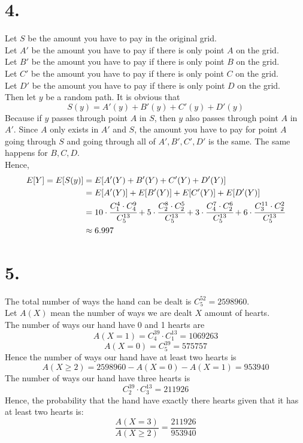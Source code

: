 \documentclass[11pt]{article}
\begin{document}
\section*{4.}
Let $S$ be the amount you have to pay in the original grid. \\
Let $A'$ be the amount you have to pay if there is only point $A$ on the grid. \\
Let $B'$ be the amount you have to pay if there is only point $B$ on the grid. \\
Let $C'$ be the amount you have to pay if there is only point $C$ on the grid. \\
Let $D'$ be the amount you have to pay if there is only point $D$ on the grid. \\
Then let $y$ be a random path. It is obvious that 
\[S(y) = A'(y) + B'(y) + C'(y) + D'(y)\]
Because if $y$ passes through point $A$ in $S$, then $y$ also passes through point $A$ in $A'$. Since $A$ only exists in $A'$ and $S$, the amount you have to pay for point $A$ going through $S$ and going through all of $A', B',C',D' $ is the same. The same happens for $B,C,D$. \\
Hence, 
\begin{equation*}
\begin{aligned}
E[Y] = E[S(y)] &= E[A'(Y) + B'(Y) + C'(Y) + D'(Y)] \\
&= E[A'(Y)] + E[B'(Y)] + E[C'(Y)] + E[D'(Y)] \\
&= 10 \cdot \cfrac{C^4_1 \cdot C^9_4}{C^{13}_5} + 5 \cdot \cfrac{C^8_2 \cdot C^5_2}{C^{13}_5} + 3 \cdot \cfrac{C^7_4 \cdot C^6_2}{C^{13}_5}+ 6 \cdot \cfrac{C^{11}_3 \cdot C^2_2}{C^{13}_5} \\
&\approx 6.997
\end{aligned}
\end{equation*}
\pagebreak
\section*{5.}
The total number of ways the hand can be dealt is $C_5^{52} = 2598960$. \\
Let $A(X)$ mean the number of ways we are dealt $X$ amount of hearts. \\
The number of ways our hand have 0 and 1 hearts are
\[
A(X = 1) = C_4^{39} \cdot C_1^{13} = 1069263
\]
\[
A(X = 0) = C_5^{39} = 575757
\]
Hence the number of ways our hand have at least two hearts is 
\[
A(X\ge 2) = 2598960 - A(X=0) - A(X=1) = 953940
\]
The number of ways our hand have three hearts is 
\[
C_2^{39} \cdot C_3^{13} = 211926
\]
Hence, the probability that the hand have exactly there hearts given that it has at least two hearts is:
\[\frac{A(X = 3)}{A(X \ge 2)} = \frac{211926}{953940}\]
\pagebreak
\end{document}
